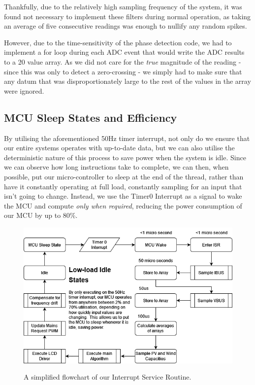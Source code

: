 \documentclass[9pt, technote, a4paper, nofonttune]{IEEEphot}
\begin{document}
        Thankfully, due to the relatively high sampling frequency of the system, it was found not necessary to implement these filters during normal operation, as taking an average of five consecutive readings was enough to nullify any random spikes.

        However, due to the time-sensitivity of the phase detection code, we had to implement a for loop during each ADC event that would write the ADC results to a 20 value array.  As we did not care for the \emph{true} magnitude of the reading - since this was only to detect a zero-crossing - we simply had to make sure that any datum that was disproportionately large to the rest of the values in the array were ignored.
        
        \subsection{MCU Sleep States and Efficiency}
        \hspace{0.5cm}By utilising the aforementioned 50Hz timer interrupt, not only do we ensure that our entire systems operates with up-to-date data, but we can also utilise the deterministic nature of this process to save power when the system is idle.
        Since we can observe how long instructions take to complete, we can then, when possible, put our micro-controller to sleep at the end of the thread, rather than have it constantly operating at full load, constantly sampling for an input that isn't going to change.  Instead, we use the Timer0 Interrupt as a signal to wake the MCU and compute \emph{only when required}, reducing the power consumption of our MCU by up to 80\%.
        \begin{figure}[h]
        \centering
        \includegraphics[width=30pc]{D5/Interrupt Service Routine.drawio.png}
        \label{fig_env1}
        \caption{A simplified flowchart of our Interrupt Service Routine.}
        \end{figure}
\end{document}
